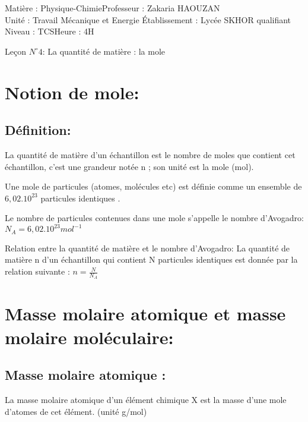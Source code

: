 \documentclass[12pt]{article}
\author{Zakaria HAOUZAN}
\date{\today}
\newcommand\headerMe[2]{\noindent{}#1\hfill#2}
\begin{document}
\headerMe{Matière : Physique-Chimie}{Professeur : Zakaria HAOUZAN}\\
\headerMe{Unité : Travail Mécanique et Energie }{Établissement : Lycée SKHOR qualifiant}\\
\headerMe{Niveau : TCS}{Heure : 4H}\\

\begin{center}

    \Large{Leçon $N^{\circ} 4 $: \color{red} La quantité de matière : la mole}
\end{center}


\section{Notion de mole: }
\subsection{Définition: }
La quantité de matière d'un échantillon est le nombre de moles que contient cet échantillon, c'est une grandeur
notée n ; son unité est la mole (mol).

Une mole de particules (atomes, molécules etc) est définie comme un ensemble de $6,02.10^{23}$ particules identiques .

Le nombre de particules contenues dans une mole s'appelle le nombre d'Avogadro: $N_A = 6,02.10^{23}mol^{-1}$

Relation entre la quantité de matière et le nombre d'Avogadro: La quantité de matière n d'un échantillon qui contient N particules identiques est donnée par la relation suivante : $n = \frac{N}{N_A}$

\section{Masse molaire atomique et masse molaire moléculaire:}
\subsection{Masse molaire atomique :}
La masse molaire atomique d’un élément chimique X est la masse d’une mole d’atomes de cet élément. (unité g/mol)
\end{document}
